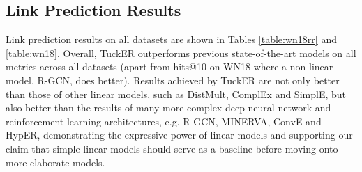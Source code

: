 \documentclass[11pt,a4paper]{article}
\begin{document}
 \begin{table*}[!t]
    \centering
    \caption{Link prediction results on WN18 and FB15k.}
     \label{table:wn18}
 \end{table*}

\subsection{Link Prediction Results}
Link prediction results on all datasets are shown in Tables \ref{table:wn18rr} and \ref{table:wn18}. Overall, TuckER outperforms previous state-of-the-art models on all metrics across all datasets (apart from hits@10 on WN18 where a non-linear model, R-GCN, does better). Results achieved by TuckER are not only better than those of other linear models, such as DistMult, ComplEx and SimplE, but also better than the results of many more complex deep neural network and reinforcement learning architectures, e.g. R-GCN, MINERVA, ConvE and HypER, demonstrating the expressive power of linear models and supporting our claim that simple linear models should serve as a baseline before moving onto more elaborate models.
\end{document}
